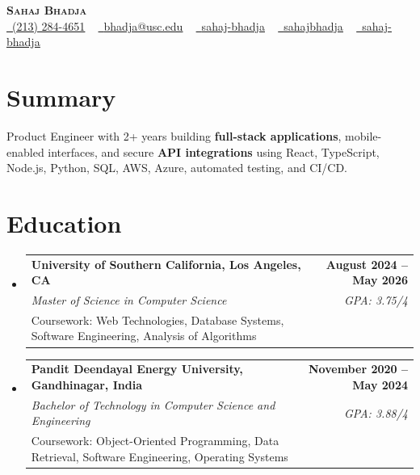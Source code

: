 \documentclass[letterpaper,10pt]{article}
\makeatletter
\newcommand{\sectionGap}{\vspace{-8pt}}
\newcommand{\resumeEduSubheading}[5]{\vspace{-1pt}\item\begin{tabular*}{1.0\textwidth}[t]{l@{\extracolsep{\fill}}r}\textbf{#1} & \textbf{\small #2} \\\textit{\small #3} & \textit{\small #4} \\\small #5 & \\\end{tabular*}\vspace{-4pt}}
\newcommand{\resumeSubHeadingListStart}{\begin{itemize}[leftmargin=0.0in, label={}]}
\newcommand{\resumeSubHeadingListEnd}{\end{itemize}}
\makeatother
\begin{document}
\begin{center}
{\Huge \scshape \textbf{Sahaj Bhadja}} \\ \vspace{1pt}
\small \href{tel:2132844651}{\faPhone\ \underline{(213) 284-4651}} ~ \href{mailto:bhadja@usc.edu}{\raisebox{-0.2\height}\faEnvelope\ \underline{bhadja@usc.edu}} ~
\href{https://www.linkedin.com/in/sahaj-bhadja/}{\raisebox{-0.2\height}\faLinkedin\ \underline{sahaj-bhadja}} ~ \href{https://github.com/SAHAJ-BHADJA}{\raisebox{-0.2\height}\faGithub\ \underline{sahajbhadja}} ~
\href{https://sahaj-bhadja.vercel.app/}{\raisebox{-0.2\height}\faGlobe\ \underline{sahaj-bhadja}}
\end{center}
\vspace{-16pt}
\section{Summary}
\begin{itemize}[leftmargin=0.15in, label={}]
\small{\item{Product Engineer with 2+ years building \textbf{full-stack applications}, mobile-enabled interfaces, and secure \textbf{API integrations} using React, TypeScript, Node.js, Python, SQL, AWS, Azure, automated testing, and CI/CD.}}
\end{itemize}
\sectionGap
\section{Education}
\resumeSubHeadingListStart
\resumeEduSubheading{University of Southern California, Los Angeles, CA}{August 2024 -- May 2026}{Master of Science in Computer Science}{GPA: 3.75/4}{Coursework: Web Technologies, Database Systems, Software Engineering, Analysis of Algorithms}
\resumeEduSubheading{Pandit Deendayal Energy University, Gandhinagar, India}{November 2020 -- May 2024}{Bachelor of Technology in Computer Science and Engineering}{GPA: 3.88/4}{Coursework: Object-Oriented Programming, Data Retrieval, Software Engineering, Operating Systems}
\resumeSubHeadingListEnd
\sectionGap
\end{document}
